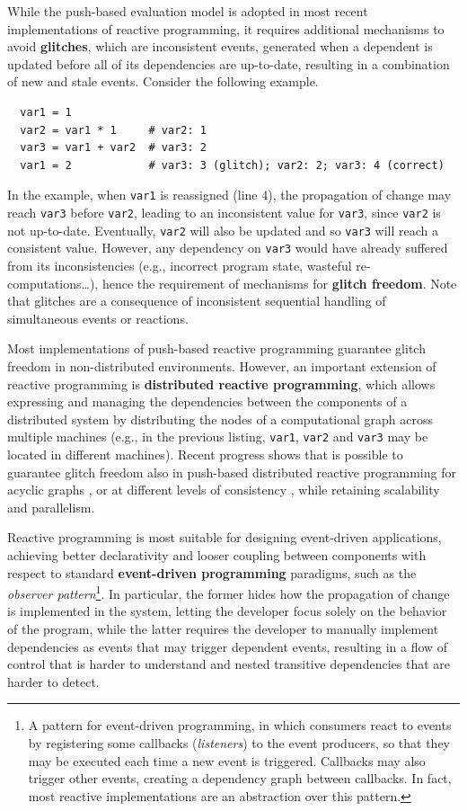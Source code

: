While the push-based evaluation model is adopted in most recent implementations
of reactive programming, it requires additional mechanisms to avoid
\textbf{glitches}, which are inconsistent events, generated when a dependent is
updated before all of its dependencies are up-to-date, resulting in a
combination of new and stale events. Consider the following example.

\begin{lstlisting}
  var1 = 1
  var2 = var1 * 1     # var2: 1
  var3 = var1 + var2  # var3: 2
  var1 = 2            # var3: 3 (glitch); var2: 2; var3: 4 (correct)
\end{lstlisting}

In the example, when \texttt{var1} is reassigned (line 4), the propagation of
change may reach \texttt{var3} before \texttt{var2}, leading to an inconsistent
value for \texttt{var3}, since \texttt{var2} is not up-to-date. Eventually,
\texttt{var2} will also be updated and so \texttt{var3} will reach a consistent
value. However, any dependency on \texttt{var3} would have already suffered
from its inconsistencies (e.g., incorrect program state, wasteful
re-computations\dots), hence the requirement of mechanisms for \textbf{glitch
freedom}. Note that glitches are a consequence of inconsistent sequential
handling of simultaneous events or reactions.

Most implementations of push-based reactive programming guarantee glitch
freedom in non-distributed environments. However, an important extension of
reactive programming is \textbf{distributed reactive programming}, which allows
expressing and managing the dependencies between the components of a
distributed system by distributing the nodes of a computational graph across
multiple machines (e.g., in the previous listing, \texttt{var1}, \texttt{var2}
and \texttt{var3} may be located in different machines). Recent progress shows
that is possible to guarantee glitch freedom also in push-based distributed
reactive programming for acyclic graphs \cite{QPROP}, or at different levels of
consistency \cite{DREAM}, while retaining scalability and parallelism.

Reactive programming is most suitable for designing event-driven applications,
achieving better declarativity and looser coupling between components with
respect to standard \textbf{event-driven programming} paradigms, such as the
\textit{observer pattern}\footnote{A pattern for event-driven programming, in
which consumers react to events by registering some callbacks
(\textit{listeners}) to the event producers, so that they may be executed each
time a new event is triggered. Callbacks may also trigger other events,
creating a dependency graph between callbacks. In fact, most reactive
implementations are an abstraction over this pattern.}. In particular, the
former hides how the propagation of change is implemented in the system,
letting the developer focus solely on the behavior of the program, while the
latter requires the developer to manually implement dependencies as events that
may trigger dependent events, resulting in a flow of control that is harder to
understand and nested transitive dependencies that are harder to detect.
